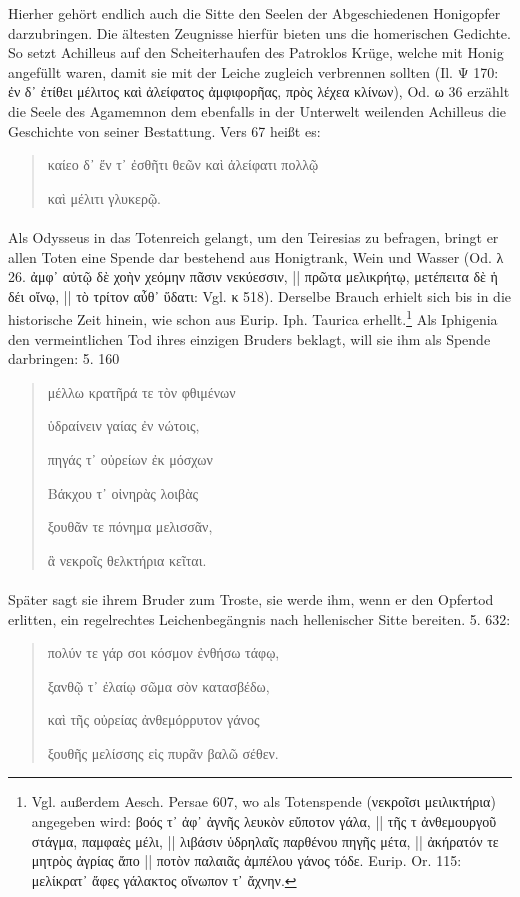 \documentclass[a4paper, 11pt, oneside]{article}
\begin{document}
Hierher gehört endlich auch die Sitte den Seelen der Abgeschiedenen Honigopfer darzubringen. Die ältesten Zeugnisse hierfür bieten uns die homerischen Gedichte. So setzt Achilleus auf den Scheiterhaufen des Patroklos Krüge, welche mit Honig angefüllt waren, damit sie mit der Leiche zugleich verbrennen sollten (Il. Ψ 170: ἐν δ᾽ ἐτίθει μέλιτος καὶ ἀλείφατος ἀμφιφορῆας, πρὸς λέχεα κλίνων), Od. ω 36 erzählt die Seele des Agamemnon dem ebenfalls in der Unterwelt weilenden Achilleus die Geschichte von seiner Bestattung. Vers 67 heißt es:
\begin{quotation}\large
καίεο δ᾽ ἔν τ᾿ ἐσθῆτι θεῶν καὶ ἀλείφατι πολλῷ

καὶ μέλιτι γλυκερῷ.
\end{quotation}
\paragraph{}
Als Odysseus in das Totenreich gelangt, um den Teiresias zu befragen, bringt er allen Toten eine Spende dar bestehend aus Honigtrank, Wein und Wasser (Od. λ 26. ἀμφ᾽ αὐτῷ δὲ χοὴν χεόμην πᾶσιν νεκύεσσιν, || πρῶτα μελικρήτῳ, μετέπειτα δὲ ἡ δέι οἴνῳ, || τὸ τρίτον αὖθ᾽ ὕδατι: Vgl. κ 518). Derselbe Brauch erhielt sich bis in die historische Zeit hinein, wie schon aus Eurip. Iph. Taurica erhellt.\footnote{Vgl. außerdem Aesch. Persae 607, wo als Totenspende (νεκροῖσι μειλικτήρια) angegeben wird: βοός τ᾿ ἀφ᾽ ἀγνῆς λευκὸν εὔποτον γάλα, || τῆς τ ἀνθεμουργοῦ στάγμα, παμφαὲς μέλι, || λιβάσιν ὑδρηλαῖς παρθένου πηγῆς μέτα, || ἀκήρατόν τε μητρὸς ἀγρίας ἄπο || ποτὸν παλαιᾶς ἀμπέλου γάνος τόδε. Eurip. Or. 115: μελίκρατ᾽ ἄφες γάλακτος οἴνωπον τ᾽ ἄχνην.} Als Iphigenia den vermeintlichen Tod ihres einzigen Bruders beklagt, will sie ihm als Spende darbringen: 5. 160
\begin{quotation}\large
μέλλω κρατῆρά τε τὸν φθιμένων

ὑδραίνειν γαίας ἐν νώτοις,

πηγάς τ᾽ οὐρείων ἐκ μόσχων

Βάκχου τ᾽ οἰνηρὰς λοιβὰς

ξουθᾶν τε πόνημα μελισσᾶν,

ἃ νεκροῖς θελκτήρια κεῖται.
\end{quotation}
\paragraph{}
Später sagt sie ihrem Bruder zum Troste, sie werde ihm, wenn er den Opfertod erlitten, ein regelrechtes Leichenbegängnis nach hellenischer Sitte bereiten. 5. 632:
\begin{quotation}\large
πολύν τε γάρ σοι κόσμον ἐνθήσω τάφῳ,

ξανθῷ τ᾽ ἐλαίῳ σῶμα σὸν κατασβέδω,

καὶ τῆς οὐρείας ἀνθεμόρρυτον γάνος

ξουθῆς μελίσσης εἰς πυρᾶν βαλῶ σέθεν.
\end{quotation}
\end{document}
